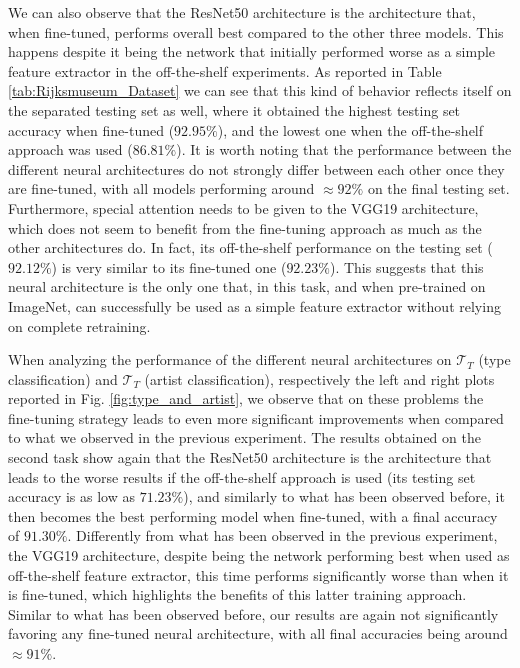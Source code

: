 We can also observe that the ResNet50 architecture is the architecture that, when fine-tuned, performs overall best compared to the other three models. This happens despite it being the network that initially performed worse as a simple feature extractor in the off-the-shelf experiments. As reported in Table \ref{tab:Rijksmuseum_Dataset} we can see that this kind of behavior reflects itself on the separated testing set as well, where it obtained the highest testing set accuracy when fine-tuned ($92.95\%$), and the lowest one when the off-the-shelf approach was used ($86.81\%$). It is worth noting that the performance between the different neural architectures do not strongly differ between each other once they are fine-tuned, with all models performing around $\approx 92\%$ on the final testing set. Furthermore, special attention needs to be given to the VGG19 architecture, which does not seem to benefit from the fine-tuning approach as much as the other architectures do. In fact, its off-the-shelf performance on the testing set ($92.12\%$) is very similar to its fine-tuned one ($92.23\%$). This suggests that this neural architecture is the only one that, in this task, and when pre-trained on ImageNet, can successfully be used as a simple feature extractor without relying on complete retraining. 

When analyzing the performance of the different neural architectures on $\mathcal{T}_T$  (type classification) and $\mathcal{T}_T$  (artist classification), respectively the left and right plots reported in Fig. \ref{fig:type_and_artist}, we observe that on these problems the fine-tuning strategy leads to even more significant improvements when compared to what we observed in the previous experiment. The results obtained on the second task show again that the ResNet50 architecture is the architecture that leads to the worse results if the off-the-shelf approach is used (its testing set accuracy is as low as $71.23\%$), and similarly to what has been observed before, it then becomes the best performing model when fine-tuned, with a final accuracy of $91.30\%$. Differently from what has been observed in the previous experiment, the VGG19 architecture, despite being the network performing best when used as off-the-shelf feature extractor, this time performs significantly worse than when it is fine-tuned, which highlights the benefits of this latter training approach. Similar to what has been observed before, our results are again not significantly favoring any fine-tuned neural architecture, with all final accuracies being around $\approx 91\%$.

